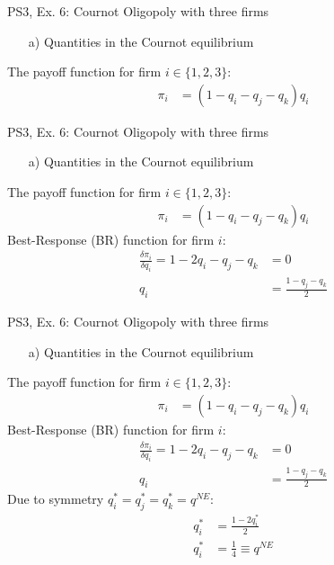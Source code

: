 \begin{frame}{PS3, Ex. 6: Cournot Oligopoly with three firms}
  \begin{multicols}{2}
    \begin{itemize}
      \item[a)] Quantities in the Cournot equilibrium
    \end{itemize}
    The payoff function for firm $i\in\{1,2,3\}$:
    \begin{align*}
        \pi_i&=(1-q_i-q_j-q_k)q_i
    \end{align*}
  \vfill\null \columnbreak
  \vfill\null
  \end{multicols}
\end{frame}
\begin{frame}{PS3, Ex. 6: Cournot Oligopoly with three firms}
  \begin{multicols}{2}
    \begin{itemize}
      \item[a)] Quantities in the Cournot equilibrium
    \end{itemize}
    The payoff function for firm $i\in\{1,2,3\}$:
    \begin{align*}
        \pi_i&=(1-q_i-q_j-q_k)q_i
    \end{align*}
    Best-Response (BR) function for firm $i$:
    \begin{align*}
        \frac{\delta\pi_i}{\delta q_i}=1-2q_i-q_j-q_k&=0\\
                                                  q_i&=\frac{1-q_j-q_k}{2}
    \end{align*}
  \vfill\null \columnbreak
  \vfill\null
  \end{multicols}
\end{frame}
\begin{frame}{PS3, Ex. 6: Cournot Oligopoly with three firms}
  \begin{multicols}{2}
    \begin{itemize}
      \item[a)] Quantities in the Cournot equilibrium
    \end{itemize}
    The payoff function for firm $i\in\{1,2,3\}$:
    \begin{align*}
        \pi_i&=(1-q_i-q_j-q_k)q_i
    \end{align*}
    Best-Response (BR) function for firm $i$:
    \begin{align*}
        \frac{\delta\pi_i}{\delta q_i}=1-2q_i-q_j-q_k&=0\\
                                                  q_i&=\frac{1-q_j-q_k}{2}
    \end{align*}
    Due to symmetry $q_i^{*}=q_j^{*}=q_k^{*}=q^{NE}$:
    \begin{align*}
        q_i^{*} &= \frac{1-2q_i^{*}}{2}\\
        q_i^{*} &= \frac{1}{4}\equiv q^{NE}
    \end{align*}
  \vfill\null \columnbreak
  \vfill\null
  \end{multicols}
\end{frame}
